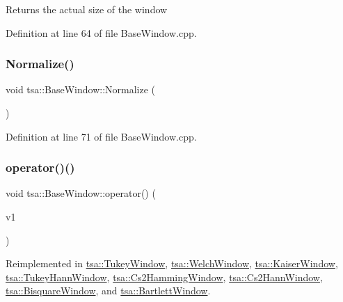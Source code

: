 \begin{DoxyReturn}{Returns}
the actual size of the window 
\end{DoxyReturn}


Definition at line 64 of file Base\+Window.\+cpp.

\mbox{\label{classtsa_1_1_base_window_ad6681a5cb29414a97af6be1ea7805a81}} 
\subsubsection{\texorpdfstring{Normalize()}{Normalize()}}
{\footnotesize\ttfamily void tsa\+::\+Base\+Window\+::\+Normalize (\begin{DoxyParamCaption}{ }\end{DoxyParamCaption})\hspace{0.3cm}{\ttfamily [virtual]}}



Definition at line 71 of file Base\+Window.\+cpp.

\mbox{\label{classtsa_1_1_base_window_a05d9edb95dc01840a1b2df78dfa3a8c1}} 
\subsubsection{\texorpdfstring{operator()()}{operator()()}\hspace{0.1cm}{\footnotesize\ttfamily [1/3]}}
{\footnotesize\ttfamily void tsa\+::\+Base\+Window\+::operator() (\begin{DoxyParamCaption}\item[{\hyperlink{namespacetsa_ac599574bcc094eda25613724b8f3ca9e}{Seq\+View\+Double} \&}]{v1 }\end{DoxyParamCaption})\hspace{0.3cm}{\ttfamily [virtual]}}



Reimplemented in \hyperlink{classtsa_1_1_tukey_window_a3a68173adce5cbbebefbadb0d7084847}{tsa\+::\+Tukey\+Window}, \hyperlink{classtsa_1_1_welch_window_a4a3b7999c9d75b916d682dc0f94c87db}{tsa\+::\+Welch\+Window}, \hyperlink{classtsa_1_1_kaiser_window_a02d18a272d16d54fa4f7c9e8b227356e}{tsa\+::\+Kaiser\+Window}, \hyperlink{classtsa_1_1_tukey_hann_window_a2a10c0c94b2c5ebbc1db201371074295}{tsa\+::\+Tukey\+Hann\+Window}, \hyperlink{classtsa_1_1_cs2_hamming_window_a41281794f2587c56ed52459fe0a106a2}{tsa\+::\+Cs2\+Hamming\+Window}, \hyperlink{classtsa_1_1_cs2_hann_window_af896b6c2dc55a283b67c2b694926918a}{tsa\+::\+Cs2\+Hann\+Window}, \hyperlink{classtsa_1_1_bisquare_window_a8ad862435b17d306997adbb8be9c9b4f}{tsa\+::\+Bisquare\+Window}, and \hyperlink{classtsa_1_1_bartlett_window_a9bad239fb8fbaa295713c904e3d9d92e}{tsa\+::\+Bartlett\+Window}.



